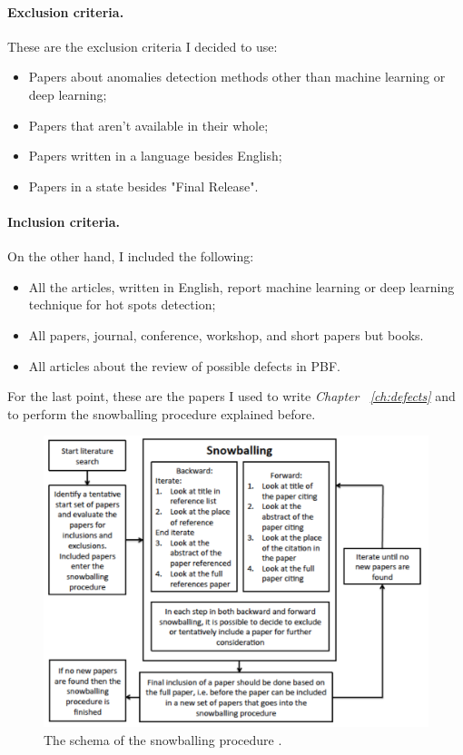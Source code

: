 \paragraph{Exclusion criteria.} These are the exclusion criteria I decided to use:
\begin{itemize}
    \item Papers about anomalies detection methods other than machine learning or deep learning;
    \item Papers that aren’t available in their whole;
    \item Papers written in a language besides English;
    \item Papers in a state besides "Final Release".
\end{itemize}
\paragraph{Inclusion criteria.} On the other hand, I included the following:
\begin{itemize}
    \item All the articles, written in English, report machine learning or deep learning technique for  hot spots detection;
    \item All papers, journal, conference, workshop, and short papers but books.
    \item All articles about the review of possible defects in PBF.
\end{itemize}
For the last point, these are the papers I used to write \emph{Chapter ~\ref{ch:defects}} and to perform the snowballing procedure explained before.

\begin{figure}
    \centering
    \includegraphics[scale=0.25]{Images/pallinadicoca.png}
    \caption[Snowballing procedure.] {The schema of the snowballing procedure \cite{wohlin_guidelines_2014}.}
    \label{fig:pallinacoca}
\end{figure}
